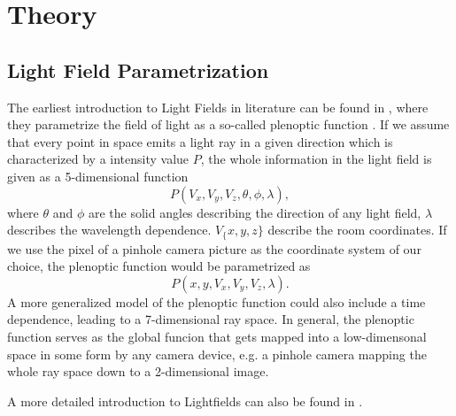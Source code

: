 \documentclass  [
  paper    = a4,
  BCOR     = 10mm,
  twoside,
  fontsize = 12pt,
  fleqn,
  toc      = bibnumbered,
  toc      = listofnumbered,
  numbers  = noendperiod,
  headings = normal,
  listof   = leveldown,
  version  = 3.03
]                                       {scrreprt}
\begin{document}
  

  \tableofcontents
\chapter{Theory}
\section{Light Field Parametrization}
The earliest introduction to Light Fields in literature can be found in \cite{adelson1991plenoptic}, where they parametrize the field of light as a  so-called \glqq plenoptic function \grqq. If we assume that every point in space emits a light ray  in a given direction which is characterized by a intensity value $P$, the whole information in the light field is given as a 5-dimensional function
\begin{equation}\label{key}
P(V_x,V_y, V_z, \theta, \phi, \lambda),
\end{equation}
where $\theta$ and $\phi$ are the solid angles describing the direction of any light field, $\lambda$ describes the wavelength dependence. $V_\{x,y,z\}$ describe the room coordinates. If we use the pixel of a pinhole camera picture as the coordinate system of our choice, the plenoptic function would be parametrized as 
\begin{equation}\label{eq:plenoptic}
P(x,y, V_x, V_y, V_z, \lambda).
\end{equation}
 A more generalized model of the plenoptic function could also include a time dependence, leading to a 7-dimensional ray space. In general, the plenoptic function serves as the global funcion that gets mapped into a low-dimensonal space in some form by any camera device, e.g. a pinhole camera mapping the whole ray space down to a 2-dimensional image.\\
 	
 A more detailed introduction to Lightfields can also be found in \cite{wanner2014orientation}. 
\end{document}
